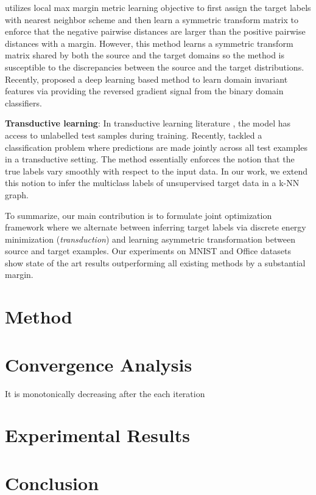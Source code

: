 \documentclass{article}
\begin{document}
\cite{tommasi13} utilizes local max margin metric learning objective \cite{lmnn} to first assign the target labels with nearest neighbor scheme and then learn a symmetric transform matrix to enforce that the negative pairwise distances are larger than the positive pairwise distances with a margin. However, this method learns a symmetric transform matrix shared by both the source and the target domains so the method is susceptible to the discrepancies between the source and the target distributions. Recently, \cite{ganin15, tzeng14} proposed a deep learning based method to learn domain invariant features via providing the reversed gradient signal from the binary domain classifiers.

\textbf{Transductive learning}: In transductive learning literature \cite{transduction}, the model has access to unlabelled test samples during training. Recently, \cite{coclassification} tackled a classification problem where predictions are made jointly across all test examples in a transductive \cite{transduction} setting. The method essentially enforces the notion that the true labels vary smoothly with respect to the input data. In our work, we extend this notion to infer the multiclass labels of unsupervised target data in a k-NN graph. 

To summarize, our main contribution is to formulate joint optimization framework where we alternate between inferring target labels via discrete energy minimization (\textit{transduction}) and learning asymmetric transformation between source and target examples. Our experiments on MNIST \cite{mnist} and Office \cite{office} datasets show state of the art results outperforming all existing methods by a substantial margin.


\section{Method} 



\section{Convergence Analysis}
It is monotonically decreasing after the each iteration

\section{Experimental Results}

\section{Conclusion} 




\end{document}
